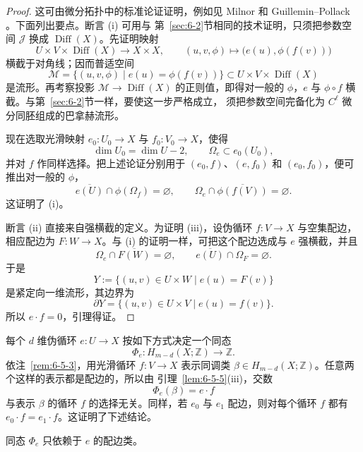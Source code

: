\begin{proof}
这可由微分拓扑中的标准论证证明，例如见 Milnor  和
Guillemin--Pollack 。下面列出要点。断言 (i) 可用与
第~\ref{sec:6-2}节相同的技术证明，只须把参数空间 $\mathcal J$ 换成
$\operatorname{Diff}(X)$。先证明映射
\[
  U\times V\times\operatorname{Diff}(X)\longrightarrow X\times X,
  \qquad
  (u,v,\phi)\longmapsto\bigl(e(u),\phi(f(v))\bigr)
\]
横截于对角线；因而普适空间
\[
  \mathcal M
  =\{(u,v,\phi)\mid e(u)=\phi(f(v))\}
  \subset U\times V\times\operatorname{Diff}(X)
\]
是流形。再考察投影 $\mathcal M\to\operatorname{Diff}(X)$ 的正则值，即得对一般的
$\phi$，$e$ 与 $\phi\circ f$ 横截。与第~\ref{sec:6-2}节一样，要使这一步严格成立，
须把参数空间完备化为 $C^\ell$ 微分同胚组成的巴拿赫流形。

现在选取光滑映射 $e_0:U_0\to X$ 与 $f_0:V_0\to X$，使得
\[
  \dim U_0=\dim U-2,\qquad \Omega_e\subset e_0(U_0),
\]
并对 $f$ 作同样选择。把上述论证分别用于
$(e_0,f)$、$(e,f_0)$ 和 $(e_0,f_0)$，便可推出对一般的 $\phi$，
\[
  \overline{e(U)}\cap\phi(\Omega_f)=\varnothing,
  \qquad
  \Omega_e\cap\overline{\phi(f(V))}=\varnothing.
\]
这证明了 (i)。

断言 (ii) 直接来自强横截的定义。为证明 (iii)，设伪循环 $f:V\to X$ 与空集配边，
相应配边为 $F:W\to X$。与 (i) 的证明一样，可把这个配边选成与 $e$ 强横截，并且
\[
  \Omega_e\cap\overline{F(W)}=\varnothing,
  \qquad
  \overline{e(U)}\cap\Omega_F=\varnothing.
\]
于是
\[
  Y:=\{(u,v)\in U\times W\mid e(u)=F(v)\}
\]
是紧定向一维流形，其边界为
\[
  \partial Y
  =\{(u,v)\in U\times V\mid e(u)=f(v)\}.
\]
所以 $e\cdot f=0$，引理得证。
\end{proof}

每个 $d$ 维伪循环 $e:U\to X$ 按如下方式决定一个同态
\[
  \Phi_e:H_{m-d}(X;\mathbb Z)\longrightarrow\mathbb Z.
\]
依注~\ref{rem:6-5-3}，用光滑循环 $f:V\to X$ 表示同调类
$\beta\in H_{m-d}(X;\mathbb Z)$。任意两个这样的表示都是配边的，所以由
引理~\ref{lem:6-5-5}(iii)，交数
\begin{equation}\label{eq:6-5-1}
  \Phi_e(\beta)=e\cdot f
\end{equation}
与表示 $\beta$ 的循环 $f$ 的选择无关。同样，若 $e_0$ 与 $e_1$ 配边，则对每个循环
$f$ 都有 $e_0\cdot f=e_1\cdot f$。这证明了下述结论。

\begin{lemma}\label{lem:6-5-6}
同态 $\Phi_e$ 只依赖于 $e$ 的配边类。
\end{lemma}


